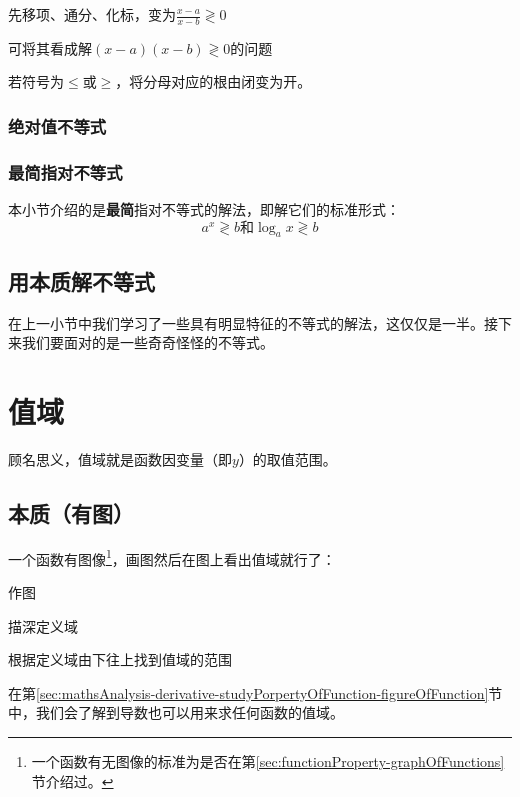 \begin{enumlist}
	\item 先移项、通分、化标，变为$\frac{x-a}{x-b}\gtrless0$
	\item 可将其看成解$(x-a)(x-b)\gtrless0$的问题
\end{enumlist}

若符号为$\leq$或$\geq$，将分母对应的根由闭变为开。

\subsubsection{绝对值不等式}

\subsubsection{最简指对不等式}
本小节介绍的是\textbf{最简}指对不等式的解法，即解它们的标准形式：\[a^x\gtrless b\text{和}\log_ax\gtrless b\]

\subsection[本质]{用本质解不等式}
在上一小节中我们学习了一些具有明显特征的不等式的解法，这仅仅是一半。接下来我们要面对的是一些奇奇怪怪的不等式。

\section{值域}
顾名思义，值域就是函数因变量（即$y$）的取值范围。

\subsection[本质]{本质（有图）}
一个函数有图像\footnote{一个函数有无图像的标准为是否在第\ref{sec:functionProperty-graphOfFunctions}节介绍过。}，画图然后在图上看出值域就行了：

\begin{enumlist}
\item 作图
\item 描深定义域
\item 根据定义域由下往上找到值域的范围
\end{enumlist}

在第\ref{sec:mathsAnalysis-derivative-studyPorpertyOfFunction-figureOfFunction}节中，我们会了解到导数也可以用来求任何函数的值域。

